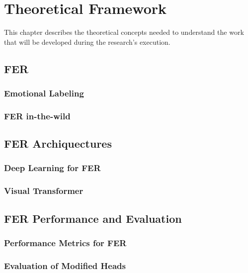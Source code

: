 \chapter{Theoretical Framework}
\label{chapter:theoretical-framework}


This chapter describes the theoretical concepts needed to understand the work that will be developed during the research's execution.


\section{FER}

\subsection{Emotional Labeling}

\subsection{FER in-the-wild}

\section{FER Archiquectures}

\subsection{Deep Learning for FER}

\subsection{Visual Transformer}

\section{FER Performance and Evaluation}


\subsection{Performance Metrics for FER}

\subsection{Evaluation of Modified Heads}

\cite{dosovitskiy_image_2021}

